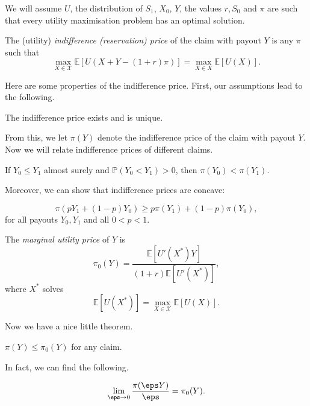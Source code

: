 \documentclass[12pt]{article}
\begin{document}
We will assume $U$, the distribution of $S_1$, $X_0$, $Y$, the values $r, S_0$ and $\pi$ are such that every utility maximisation problem has an optimal solution.

\begin{definition}
	The (utility) \emph{indifference (reservation) price} of the claim with payout $Y$ is any $\pi$ such that
	\[
	\max_{X \in \mathcal{X}}\mathbb{E}[U(X+Y-(1+r)\pi)] = \max_{X \in X} \mathbb{E}[U(X)].
	\]
\end{definition}

Here are some properties of the indifference price. First, our assumptions lead to the following.

\begin{theorem}
	The indifference price exists and is unique.
\end{theorem}

From this, we let $\pi(Y)$ denote the indifference price of the claim with payout $Y$. Now we will relate indifference prices of different claims.

\begin{theorem}
	If $Y_0 \leq Y_1$ almost surely and $\mathbb{P}(Y_0 < Y_1) > 0$, then $\pi(Y_0) < \pi(Y_1)$.
\end{theorem}

Moreover, we can show that indifference prices are concave:
\begin{theorem}
	\[
	\pi(pY_1 + (1-p)Y_0) \geq p \pi(Y_1) + (1-p)\pi(Y_0),
	\]
	for all payouts $Y_0, Y_1$ and all $0 < p < 1$.
\end{theorem}

\begin{definition}
	The \emph{marginal utility price} of $Y$ is
	\[
	\pi_0(Y) = \frac{\mathbb{E}[U'(X^{\ast})Y]}{(1+r)\mathbb{E}[U'(X^{\ast})]},
	\]
	where $X^{\ast}$ solves
	\[
	\mathbb{E}[U(X^{\ast})] = \max_{X \in \mathcal{X}} \mathbb{E}[U(X)].
	\]
\end{definition}

Now we have a nice little theorem.

\begin{theorem}
	$\pi(Y) \leq \pi_0(Y)$ for any claim.
\end{theorem}

In fact, we can find the following.

\begin{theorem}
	\[
	\lim_{\eps \to 0} \frac{\pi(\eps Y)}{\eps} = \pi_0(Y).
	\]
\end{theorem}
\end{document}
